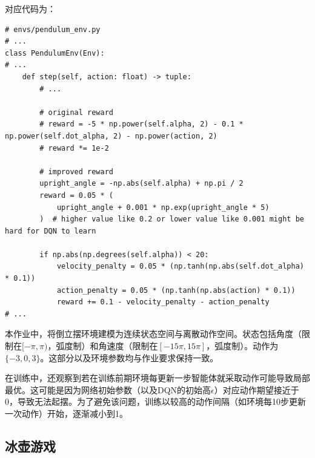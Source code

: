 \documentclass[12pt,a4paper]{article}
\begin{document}
对应代码为：
\begin{lstlisting}
# envs/pendulum_env.py
# ...
class PendulumEnv(Env):
# ...
    def step(self, action: float) -> tuple:
        # ...
        
        # original reward
        # reward = -5 * np.power(self.alpha, 2) - 0.1 * np.power(self.dot_alpha, 2) - np.power(action, 2)
        # reward *= 1e-2

        # improved reward
        upright_angle = -np.abs(self.alpha) + np.pi / 2
        reward = 0.05 * (
            upright_angle + 0.001 * np.exp(upright_angle * 5)
        )  # higher value like 0.2 or lower value like 0.001 might be hard for DQN to learn

        if np.abs(np.degrees(self.alpha)) < 20:
            velocity_penalty = 0.05 * (np.tanh(np.abs(self.dot_alpha) * 0.1))
            action_penalty = 0.05 * (np.tanh(np.abs(action) * 0.1))
            reward += 0.1 - velocity_penalty - action_penalty
# ...
\end{lstlisting}

本作业中，将倒立摆环境建模为连续状态空间与离散动作空间。状态包括角度（限制在$[-\pi,\pi)$，弧度制）和角速度（限制在$[-15\pi,15\pi]$，弧度制）。动作为$\{-3,0,3\}$。这部分以及环境参数均与作业要求保持一致。

在训练中，还观察到若在训练前期环境每更新一步智能体就采取动作可能导致局部最优。这可能是因为网络初始参数（以及DQN的初始高$\epsilon$）对应动作期望接近于0，导致无法起摆。为了避免该问题，训练以较高的动作间隔（如环境每10步更新一次动作）开始，逐渐减小到1。

\subsection{冰壶游戏}
\end{document}
